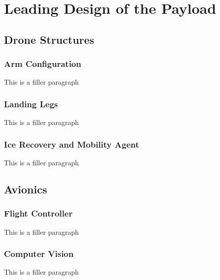 \chapter{Leading Design of the Payload}

	\section{Drone Structures}\label{PL:Design:Structures}
		\subsection{Arm Configuration}
			This is a filler paragraph

		\subsection{Landing Legs}
			This is a filler paragraph
	
		\subsection{Ice Recovery and Mobility Agent}
			This is a filler paragraph

	\section{Avionics}\label{PL:Design: Avionics}
		\subsection{Flight Controller}
			This is a filler paragraph

		\subsection{Computer Vision}
			This is a filler paragraph
